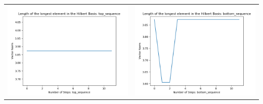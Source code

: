 \documentclass[10pt]{article}
\begin{document}
\begin{tabular}{c|c}
\begin{minipage}{.45\textwidth}
\includegraphics[width=\textwidth]{"DATA/4d/5 generators 2 bound E/top_sequence LENGTH"}
\end{minipage} &
\begin{minipage}{.45\textwidth}
\includegraphics[width=\textwidth]{"DATA/4d/5 generators 2 bound E bottomup/bottom_sequence LENGTH"}
\end{minipage}
\end{tabular}
\end{document}

